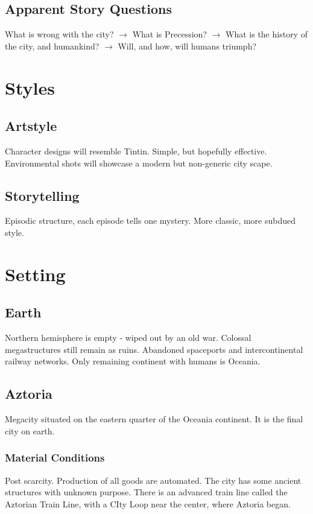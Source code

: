 \documentclass[11pt]{article}
\begin{document}
	\subsection{Apparent Story Questions}
	What is wrong with the city? $\rightarrow$ 
	What is Precession? $\rightarrow$  
	What is the history of the city, and humankind? $\rightarrow$ 
	Will, and how, will humans triumph?
\newpage






\section{Styles}
	\subsection{Artstyle}
	Character designs will resemble Tintin. Simple, but hopefully effective.
	Environmental shots will showcase a modern but non-generic city scape.
	\subsection{Storytelling}
	Episodic structure, each episode tells one mystery. 
	More classic, more subdued style.
\newpage





\section{Setting}
	\subsection{Earth}
	Northern hemisphere is empty - wiped out by an old war.
	Colossal megastructures still remain as ruins.
	Abandoned spaceports and intercontinental railway networks.
	Only remaining continent with humans is Oceania.
	\subsection{Aztoria}
	Megacity situated on the eastern quarter of the Oceania continent. It is the final city on earth.
		\subsubsection{Material Conditions}
		Post scarcity. Production of all goods are automated. 
		The city has some ancient structures with unknown purpose.
		There is an advanced train line called the Aztorian Train Line, with a CIty Loop near the center, where Aztoria began. 
\end{document}
